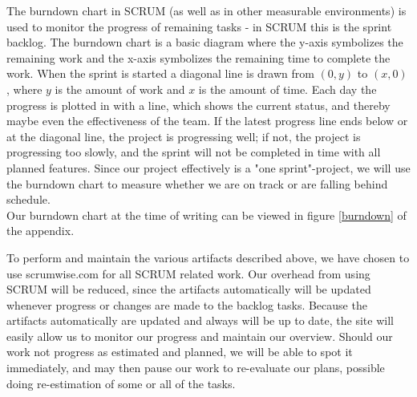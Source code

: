 The burndown chart in SCRUM (as well as in other measurable environments) is used to monitor the progress of remaining tasks - in SCRUM this is the sprint backlog.
The burndown chart is a basic diagram where the y-axis symbolizes the remaining work and the x-axis symbolizes the remaining time to complete the work.
When the sprint is started a diagonal line is drawn from $(0, y)$ to $(x, 0)$, where $y$ is the amount of work and $x$ is the amount of time.
Each day the progress is plotted in with a line, which shows the current status, and thereby maybe even the effectiveness of the team. If the latest progress line ends below or at the diagonal line, the project is progressing well; if not, the project is progressing too slowly, and the sprint will not be completed in time with all planned features.
Since our project effectively is a "one sprint"-project, we will use the burndown chart to measure whether we are on track or are falling behind schedule.\\
Our burndown chart at the time of writing can be viewed in figure \ref{burndown} of the appendix.

To perform and maintain the various artifacts described above, we have chosen to use scrumwise.com for all SCRUM related work. Our overhead from using SCRUM will be reduced, since the artifacts automatically will be updated whenever progress or changes are made to the backlog tasks.
Because the artifacts automatically are updated and always will be up to date, the site will easily allow us to monitor our progress and maintain our overview. Should our work not progress as estimated and planned, we will be able to spot it immediately, and may then pause our work to re-evaluate our plans, possible doing re-estimation of some or all of the tasks.
